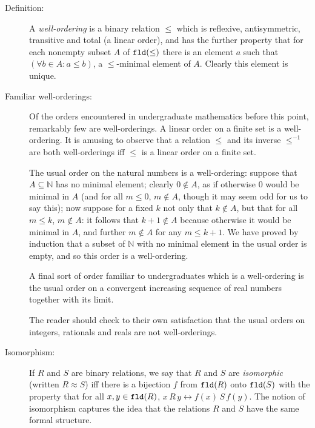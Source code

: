 \documentclass[12pt]{book}
\begin{document}
\begin{description}

\item[Definition:]  A {\em well-ordering\/} is a binary relation $\leq$ which is reflexive, antisymmetric, transitive and total (a linear order),
and has the further property that  for each nonempty subset $A$ of ${\tt fld}(\leq)$ there is an element $a$ such that $(\forall b\in A:a \leq b)$,
a $\leq$-minimal element of $A$.  Clearly this element is unique.

\item[Familiar well-orderings:]  Of the orders encountered in undergraduate mathematics before this point, remarkably few are well-orderings.
A linear order on a finite set is a well-ordering.  It is amusing to observe that a relation $\leq$ and its inverse $\leq^{-1}$ are both well-orderings iff $\leq$ is a linear order on a finite set.  

The usual order on the natural numbers is a well-ordering:  suppose that $A \subseteq \mathbb N$ has no minimal element;  clearly $0 \not\in A$, as if otherwise 0 would be minimal in $A$  (and for all $m \leq 0$, $m \not\in A$, though it may seem odd for us to say this);  now suppose for a fixed $k$ not only that $k \not\in A$, but that
for all $m \leq k$, $m \not\in A$:  it follows that $k+1 \not\in A$ because otherwise it would be minimal in $A$, and further $m \not\in A$ for any
$m \leq k+1$.  We have proved by induction that a subset of $\mathbb N$ with no minimal element in the usual order is empty, and so this order is a well-ordering.

A final sort of order familiar to undergraduates which is a well-ordering is the usual order on a convergent increasing sequence of real numbers together with its limit.

The reader should check to their own satisfaction that the usual orders on integers, rationals and reals are not well-orderings.

\item[Isomorphism:]  If $R$ and $S$ are binary relations, we say that $R$ and $S$ are {\em isomorphic\/} (written $R \approx S$) iff there
is a bijection $f$ from ${\tt fld}(R)$ onto ${\tt fld}(S)$ with the property that for all $x,y \in {\tt fld}(R)$, $x \, R \, y \leftrightarrow f(x) \,S\,f(y)$.  The notion of isomorphism captures the idea that the relations $R$ and $S$ have the same formal structure.

\end{description}
\end{document}
